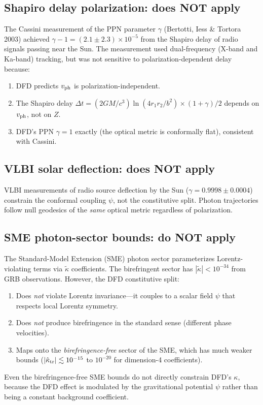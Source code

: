 \documentclass[11pt,a4paper]{article}
\theoremstyle{definition}
\begin{document}
\subsection{Shapiro delay polarization: does NOT apply}

The Cassini measurement of the PPN parameter $\gamma$
(Bertotti, Iess \& Tortora 2003) achieved
$\gamma - 1 = (2.1 \pm 2.3) \times 10^{-5}$ from the
Shapiro delay of radio signals passing near the Sun.
The measurement used dual-frequency (X-band and Ka-band)
tracking, but was not sensitive to polarization-dependent
delay because:
\begin{enumerate}
\item DFD predicts $v_{\rm ph}$ is polarization-independent.
\item The Shapiro delay $\Delta t = (2GM/c^3)\ln(4r_1 r_2/b^2)
  \times (1 + \gamma)/2$ depends on $v_{\rm ph}$, not on $Z$.
\item DFD's PPN $\gamma = 1$ exactly (the optical metric is
  conformally flat), consistent with Cassini.
\end{enumerate}

\subsection{VLBI solar deflection: does NOT apply}

VLBI measurements of radio source deflection by the Sun
($\gamma = 0.9998 \pm 0.0004$) constrain the conformal
coupling $\psi$, not the constitutive split.  Photon
trajectories follow null geodesics of the \emph{same} optical
metric regardless of polarization.

\subsection{SME photon-sector bounds: do NOT apply}

The Standard-Model Extension (SME) photon sector parameterizes
Lorentz-violating terms via $\tilde\kappa$ coefficients.  The
birefringent sector has $|\tilde\kappa| < 10^{-34}$ from GRB
observations.  However, the DFD constitutive split:
\begin{enumerate}
\item Does \emph{not} violate Lorentz invariance---it couples
  to a scalar field $\psi$ that respects local Lorentz symmetry.
\item Does \emph{not} produce birefringence in the standard sense
  (different phase velocities).
\item Maps onto the \emph{birefringence-free} sector of the
  SME, which has much weaker bounds
  ($|\hat\kappa_{\rm tr}| \lesssim 10^{-15}$ to $10^{-20}$
  for dimension-4 coefficients).
\end{enumerate}
Even the birefringence-free SME bounds do not directly constrain
DFD's $\kappa$, because the DFD effect is modulated by the
gravitational potential $\psi$ rather than being a constant
background coefficient.
\end{document}

